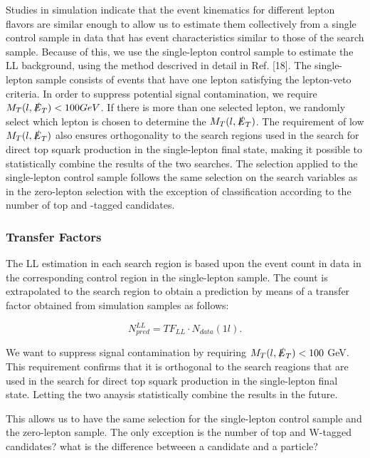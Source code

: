 Studies in simulation indicate that the event kinematics for different lepton flavors are similar enough to allow us to estimate them collectively from a single control sample in data that has event characteristics similar to those of the search sample. Because of this, we use the single-lepton control sample to estimate the LL background, using the method descrived in detail in Ref. [18]. The single-lepton sample consists of events that have one lepton satisfying the lepton-veto criteria. In order to suppress potential signal contamination, we require $M_T(l,\slashed{E}_{T})<100 GeV$. If there is more than one selected lepton, we randomly select which lepton is chosen to determine the $M_T(l,\slashed{E}_{T})$. The requirement of low $M_T(l,\slashed{E}_{T})$ also ensures orthogonality to the search regions used in the search for direct top squark production in the single-lepton final state, making it possible to statistically combine the results of the two searches. The selection applied to the single-lepton control sample follows the same selection on the search variables as in the zero-lepton selection with the exception of classification according to the number of top and \W-tagged candidates. 

\subsubsection{Transfer Factors}
\label{subsec:TF}

The LL estimation in each search region is based upon the event count in data in the corresponding control region in the single-lepton sample. The count is extrapolated to the search region to obtain a prediction by means of a transfer factor obtained from simulation samples as follows: 

\begin{equation}
\label{eqn:LLTF}
N_{pred}^{LL}=TF_{LL} \cdot N_{data}(1l).
\end{equation}

We want to suppress signal contamination by requiring $M_{T}(l, \slashed{E}_{T}) < 100$ GeV. This requirement confirms that it is orthogonal to the search reagions that are used in the search for direct top squark production in the single-lepton final state. Letting the two anaysis statistically combine the results in the future. 

This allows us to have the same selection for the single-lepton control sample and the zero-lepton sample. The only exception is the number of top and W-tagged candidates? what is the difference betweeen a candidate and a particle?

